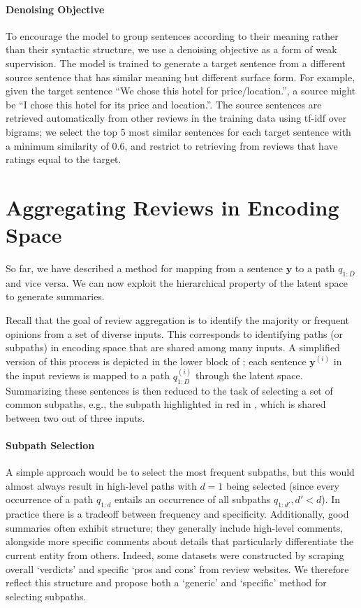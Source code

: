\documentclass[11pt]{article}
\begin{document}
\paragraph{Denoising Objective} To encourage the model to group sentences according to their meaning rather than their syntactic structure, we use a denoising objective as a form of weak supervision. The model is trained to generate a target sentence from a different source sentence that has similar meaning but different surface form. For example, given the target sentence ``We chose this hotel for price/location.'',   a source might be ``I chose this hotel for its price and location.''. The source sentences are retrieved automatically from other reviews in the training data using tf-idf \cite{tfidf} over bigrams; we select the top 5 most similar sentences for each target sentence with a minimum similarity of 0.6, and restrict to retrieving from reviews that have ratings equal to the target. 



\section{Aggregating Reviews in Encoding Space}
\label{sec:opagg}
\vspace{-.1cm}
So far, we have described a method for mapping from a sentence $\textbf{y}$ to a path $q_{1:D}$ and vice versa. We can now exploit the hierarchical property of the latent space to generate summaries.

Recall that the goal of review aggregation is to identify the majority or frequent opinions from a set of diverse inputs. This corresponds to identifying paths (or subpaths) in encoding space that are shared among many inputs. A simplified version of this process is depicted in the lower block of ; each sentence $\textbf{y}^{(i)}$ in the input reviews is mapped to a path $q_{1:D}^{(i)}$ through the latent space. Summarizing these sentences is then reduced to the task of selecting a set of common subpaths, e.g., the subpath highlighted in red in , which is shared between two out of three inputs.

\paragraph{Subpath Selection}
\label{sec:summ_construction}

A simple approach would be to select the most frequent subpaths, but this would almost always result in high-level paths with $d=1$ being selected (since every occurrence of a path $q_{1:d}$ entails an occurrence of all subpaths $q_{1:d'}, d'<d$). In practice there is a tradeoff between frequency and specificity. Additionally, good summaries often exhibit structure; they generally include high-level comments, alongside more specific comments about details that particularly differentiate the current entity from others. Indeed, some datasets \cite[e.g., AmaSum,][]{brazinskas-etal-2021-learning} were constructed by scraping overall `verdicts' and specific `pros and cons' from review websites. We therefore reflect this structure and propose both a `generic' and `specific' method for selecting subpaths.
\end{document}
